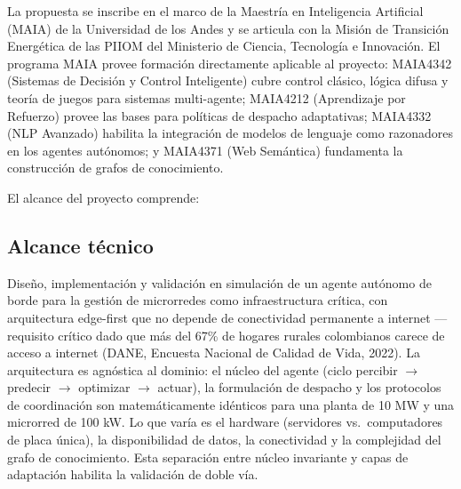 \documentclass[12pt,letterpaper]{article}
\begin{document}
La propuesta se inscribe en el marco de la Maestr\'ia en Inteligencia Artificial (MAIA) de la Universidad de los Andes y se articula con la Misi\'on de Transici\'on Energ\'etica de las PIIOM del Ministerio de Ciencia, Tecnolog\'ia e Innovaci\'on. El programa MAIA provee formaci\'on directamente aplicable al proyecto: MAIA4342 (Sistemas de Decisi\'on y Control Inteligente) cubre control cl\'asico, l\'ogica difusa y teor\'ia de juegos para sistemas multi-agente; MAIA4212 (Aprendizaje por Refuerzo) provee las bases para pol\'iticas de despacho adaptativas; MAIA4332 (NLP Avanzado) habilita la integraci\'on de modelos de lenguaje como razonadores en los agentes aut\'onomos; y MAIA4371 (Web Sem\'antica) fundamenta la construcci\'on de grafos de conocimiento.

El alcance del proyecto comprende:

\subsection*{Alcance t\'ecnico}

Dise\~no, implementaci\'on y validaci\'on en simulaci\'on de un agente aut\'onomo de borde para la gesti\'on de microrredes como infraestructura cr\'itica, con arquitectura edge-first que no depende de conectividad permanente a internet --- requisito cr\'itico dado que m\'as del 67\% de hogares rurales colombianos carece de acceso a internet (DANE, Encuesta Nacional de Calidad de Vida, 2022). La arquitectura es agn\'ostica al dominio: el n\'ucleo del agente (ciclo percibir $\rightarrow$ predecir $\rightarrow$ optimizar $\rightarrow$ actuar), la formulaci\'on de despacho y los protocolos de coordinaci\'on son matem\'aticamente id\'enticos para una planta de 10 MW y una microrred de 100 kW. Lo que var\'ia es el hardware (servidores vs.\ computadores de placa \'unica), la disponibilidad de datos, la conectividad y la complejidad del grafo de conocimiento. Esta separaci\'on entre n\'ucleo invariante y capas de adaptaci\'on habilita la validaci\'on de doble v\'ia.
\end{document}
